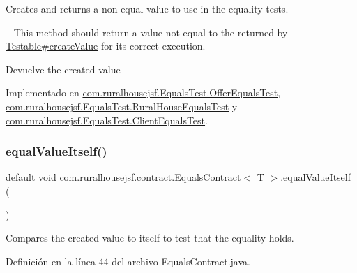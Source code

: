 Creates and returns a non equal value to use in the equality tests. 

~\newline
 This method should return a value not equal to the returned by \mbox{\hyperlink{a00244_ae4546a381488faaba1ef7c0f8688de9c}{Testable\#create\+Value}} for its correct execution.

\begin{DoxyReturn}{Devuelve}
the created value 
\end{DoxyReturn}


Implementado en \mbox{\hyperlink{a00260_a459de0dbb86bdaa6f54b99eb887a2eab}{com.\+ruralhousejsf.\+Equals\+Test.\+Offer\+Equals\+Test}}, \mbox{\hyperlink{a00256_a4021dc1a2dacaed55fa5bacec7ca6165}{com.\+ruralhousejsf.\+Equals\+Test.\+Rural\+House\+Equals\+Test}} y \mbox{\hyperlink{a00252_a25218bb97f8e3d88b9dd7e13afd0a6ed}{com.\+ruralhousejsf.\+Equals\+Test.\+Client\+Equals\+Test}}.

\mbox{\label{a00240_a5daf9e73e1147c8765c0fcf3d3dddbb0}} 
\subsubsection{\texorpdfstring{equalValueItself()}{equalValueItself()}}
{\footnotesize\ttfamily default void \mbox{\hyperlink{a00240}{com.\+ruralhousejsf.\+contract.\+Equals\+Contract}}$<$ T $>$.equal\+Value\+Itself (\begin{DoxyParamCaption}{ }\end{DoxyParamCaption})}



Compares the created value to itself to test that the equality holds. 



Definición en la línea 44 del archivo Equals\+Contract.\+java.

\mbox{\label{a00240_acaa5c1c071bf63a3e629977c73131fc8}} 
